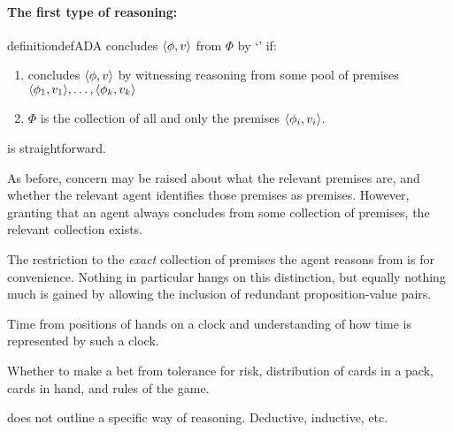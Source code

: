 \paragraph*{The first type of reasoning: \adA{}}

\begin{note}
  \begin{restatable}[\adA{}]{definition}{defADA}
    \label{AR:adA}
    \label{def:adA}
    \vAgent{} concludes \(\langle \phi, v \rangle\) from \(\Phi\) by `\adA{}' if:
    \begin{enumerate}[label=\textsf{S:\arabic*}., ref=(\textsf{S}:\arabic*)]
    \item
      \label{def:adA:psi}
      \vAgent{} concludes \(\langle \phi, v \rangle\) by witnessing reasoning from some pool of premises \(\langle \phi_{1}, v_{1} \rangle,\dots,\langle \phi_{k}, v_{k} \rangle\)
    \item
      \(\Phi\) is the collection of all and only the premises \(\langle \phi_{i}, v_{i} \rangle\).
    \end{enumerate}
    \vspace{-\baselineskip}
  \end{restatable}

  \adA{} is straightforward.

  As before, concern may be raised about what the relevant premises are, and whether the relevant agent identifies those premises as premises.
  However, granting that an agent always concludes from some collection of premises, the relevant collection exists.

  The restriction to the \emph{exact} collection of premises the agent reasons from is for convenience.
  Nothing in particular hangs on this distinction, but equally nothing much is gained by allowing the inclusion of redundant proposition-value pairs.
\end{note}

\begin{note}[\illu{1}]
  Time from positions of hands on a clock and understanding of how time is represented by such a clock.

  Whether to make a bet from tolerance for risk, distribution of cards in a pack, cards in hand, and rules of the game.
\end{note}

\begin{note}
  \adA{} does not outline a specific way of reasoning.
  Deductive, inductive, etc.\
\end{note}

